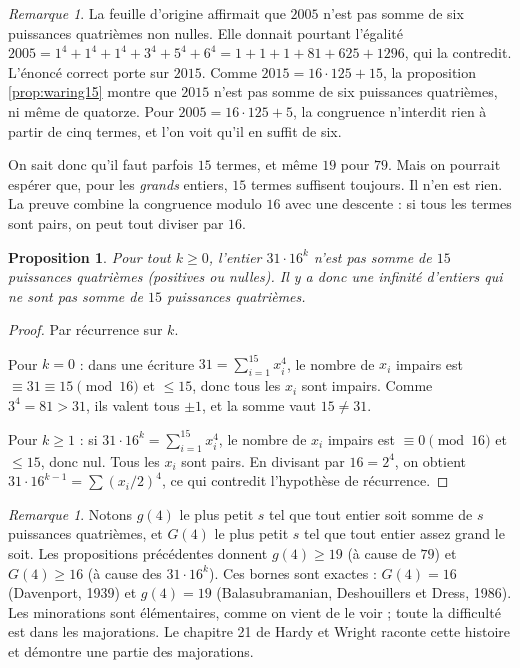 \documentclass[11pt,a4paper]{article}
\theoremstyle{plain}
\newtheorem{proposition}[theoreme]{Proposition}
\theoremstyle{definition}
\theoremstyle{remark}
\newtheorem{remarque}[theoreme]{Remarque}
\begin{document}
\begin{remarque}\label{rem:faux-2005}
La feuille d'origine affirmait que $2005$ n'est pas somme de six puissances quatrièmes non nulles. Elle donnait pourtant l'égalité $2005=1^4+1^4+1^4+3^4+5^4+6^4=1+1+1+81+625+1296$, qui la contredit. L'énoncé correct porte sur $2015$. Comme $2015=16\cdot125+15$, la proposition \ref{prop:waring15} montre que $2015$ n'est pas somme de six puissances quatrièmes, ni même de quatorze. Pour $2005=16\cdot125+5$, la congruence n'interdit rien à partir de cinq termes, et l'on voit qu'il en suffit de six.
\end{remarque}

On sait donc qu'il faut parfois $15$ termes, et même $19$ pour $79$. Mais on pourrait espérer que, pour les \emph{grands} entiers, $15$ termes suffisent toujours. Il n'en est rien. La preuve combine la congruence modulo $16$ avec une descente : si tous les termes sont pairs, on peut tout diviser par $16$.

\begin{proposition}\label{prop:waring16}
Pour tout $k\geq0$, l'entier $31\cdot16^k$ n'est pas somme de $15$ puissances quatrièmes (positives ou nulles). Il y a donc une infinité d'entiers qui ne sont pas somme de $15$ puissances quatrièmes.
\end{proposition}

\begin{proof}
Par récurrence sur $k$.

Pour $k=0$ : dans une écriture $31=\sum_{i=1}^{15}x_i^4$, le nombre de $x_i$ impairs est $\equiv31\equiv15\pmod{16}$ et $\leq15$, donc tous les $x_i$ sont impairs. Comme $3^4=81>31$, ils valent tous $\pm1$, et la somme vaut $15\neq31$.

Pour $k\geq1$ : si $31\cdot16^k=\sum_{i=1}^{15}x_i^4$, le nombre de $x_i$ impairs est $\equiv0\pmod{16}$ et $\leq15$, donc nul. Tous les $x_i$ sont pairs. En divisant par $16=2^4$, on obtient $31\cdot16^{k-1}=\sum(x_i/2)^4$, ce qui contredit l'hypothèse de récurrence.
\end{proof}

\begin{remarque}
Notons $g(4)$ le plus petit $s$ tel que tout entier soit somme de $s$ puissances quatrièmes, et $G(4)$ le plus petit $s$ tel que tout entier assez grand le soit. Les propositions précédentes donnent $g(4)\geq19$ (à cause de $79$) et $G(4)\geq16$ (à cause des $31\cdot16^k$). Ces bornes sont exactes : $G(4)=16$ (Davenport, 1939) et $g(4)=19$ (Balasubramanian, Deshouillers et Dress, 1986). Les minorations sont élémentaires, comme on vient de le voir ; toute la difficulté est dans les majorations. Le chapitre 21 de Hardy et Wright \cite{hw} raconte cette histoire et démontre une partie des majorations.
\end{remarque}
\end{document}
